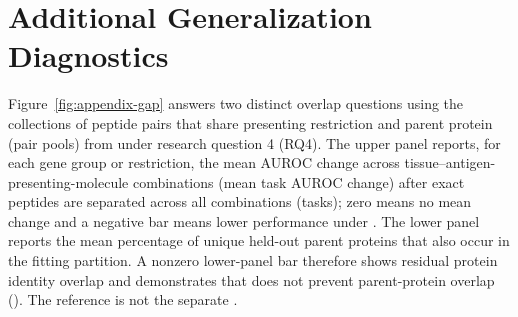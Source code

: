 \section{Additional Generalization Diagnostics}

Figure~\ref{fig:appendix-gap} answers two distinct overlap questions using the collections of peptide pairs that share presenting restriction and parent protein (pair pools) from \plainMatchedOOF{} under research question 4 (RQ4). The upper panel reports, for each \plainHLA{} gene group or \plainHtwo{} restriction, the mean AUROC change across tissue--antigen-presenting-molecule combinations (mean task AUROC change) after exact peptides are separated across all combinations (tasks); zero means no mean change and a negative bar means lower performance under \plainPeptideOOF{}. The lower panel reports the mean percentage of unique held-out parent proteins that also occur in the fitting partition. A nonzero lower-panel bar therefore shows residual protein identity overlap and demonstrates that \plainPeptideOOF{} does not prevent parent-protein overlap (\plainProteinDisjoint{}). The \plainMatchedOOF{} reference is not the separate \plainFixedTest{}.

